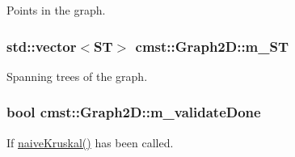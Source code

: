 Points in the graph. 

\subsubsection[{\texorpdfstring{m\_ST}{m_ST}}]{\setlength{\rightskip}{0pt plus 5cm}std::vector$<${\bf ST}$>$ cmst::Graph2D::m\_ST\hspace{0.3cm}{\ttfamily [protected]}}\hypertarget{classcmst_1_1_graph2_d_a829dc681f90679478b0ba9676af0bc03}{}\label{classcmst_1_1_graph2_d_a829dc681f90679478b0ba9676af0bc03}


Spanning trees of the graph. 

\subsubsection[{\texorpdfstring{m\_validateDone}{m_validateDone}}]{\setlength{\rightskip}{0pt plus 5cm}bool cmst::Graph2D::m\_validateDone\hspace{0.3cm}{\ttfamily [private]}}\hypertarget{classcmst_1_1_graph2_d_ae609751f322449c3ac98303a8d6fa747}{}\label{classcmst_1_1_graph2_d_ae609751f322449c3ac98303a8d6fa747}


If \hyperlink{classcmst_1_1_graph2_d_af0db14845e80799be1d4fb15ca230110}{naiveKruskal()} has been called. 

